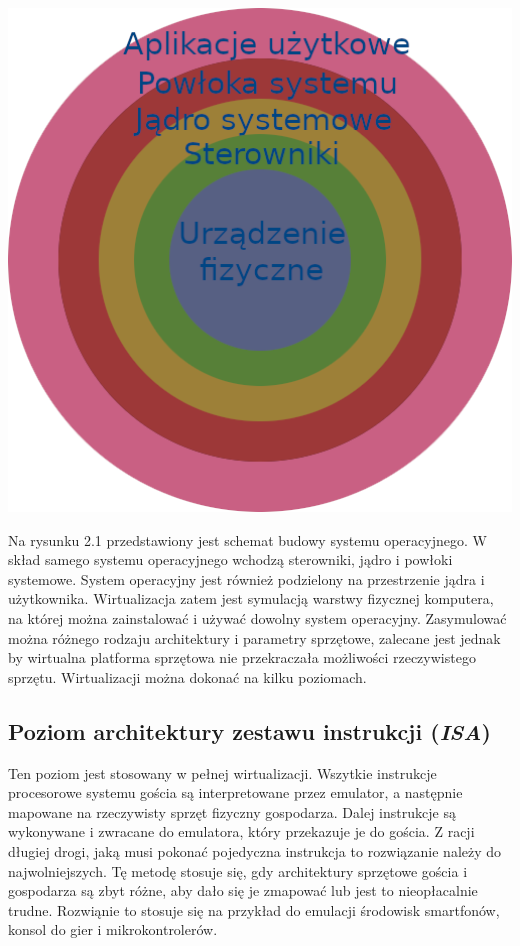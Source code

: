 \documentclass[polish, a4paper, 12pt, oneside]{book}
\begin{document}
\begin{center}
\begin{samepage}
\includegraphics[width=160mm]{schemat_os.png}
\end{samepage}
\end{center}

Na rysunku 2.1 przedstawiony jest schemat budowy systemu operacyjnego. W skład samego systemu operacyjnego wchodzą sterowniki, jądro i powłoki systemowe. System operacyjny jest również podzielony na przestrzenie jądra i użytkownika. Wirtualizacja zatem jest symulacją warstwy fizycznej komputera, na której można zainstalować i używać dowolny system operacyjny. Zasymulować można różnego rodzaju architektury i parametry sprzętowe, zalecane jest jednak by wirtualna platforma sprzętowa nie przekraczała możliwości rzeczywistego sprzętu. Wirtualizacji można dokonać na kilku poziomach. 
\subsection {Poziom architektury zestawu instrukcji (\textit{ISA})}
Ten poziom jest stosowany w pełnej wirtualizacji. Wszytkie instrukcje procesorowe systemu gościa są interpretowane przez emulator, a następnie mapowane na rzeczywisty sprzęt fizyczny gospodarza. Dalej instrukcje są wykonywane i zwracane do emulatora, który przekazuje je do gościa. Z racji długiej drogi, jaką musi pokonać pojedyczna instrukcja to rozwiązanie należy do najwolniejszych. Tę metodę stosuje się, gdy architektury sprzętowe gościa i gospodarza są zbyt różne, aby dało się je zmapować lub jest to nieopłacalnie trudne. Rozwiąnie to stosuje się na przykład do emulacji środowisk smartfonów, konsol do gier i mikrokontrolerów.
\end{document}
